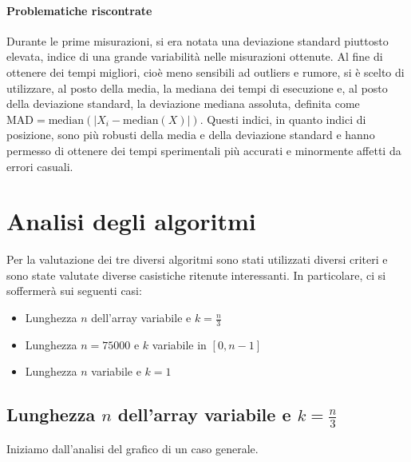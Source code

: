 \documentclass{article}
\begin{document}
	
	\paragraph{Problematiche riscontrate}
	Durante le prime misurazioni, si era notata una deviazione standard piuttosto elevata, indice di una grande variabilità nelle misurazioni ottenute. Al fine di ottenere dei tempi migliori, cioè meno sensibili ad outliers e rumore, si è scelto di utilizzare, al posto della media, la mediana dei tempi di esecuzione e, al posto della deviazione standard, la deviazione mediana assoluta, definita come $\textrm{MAD}=\textrm{median}\left(\mathopen|X_{i}-\textrm{median}\left(X\right)\mathclose|\right)$. Questi indici, in quanto indici di posizione, sono più robusti della media e della deviazione standard e hanno permesso di ottenere dei tempi sperimentali più accurati e minormente affetti da errori casuali.
	
	\newpage	
	\section{Analisi degli algoritmi}
	Per la valutazione dei tre diversi algoritmi sono stati utilizzati diversi criteri e sono state valutate diverse casistiche ritenute interessanti. In particolare, ci si soffermerà sui seguenti casi:
	
	\begin{itemize}
		\item Lunghezza $n$ dell'array variabile e $k=\frac{n}{3}$
		\item Lunghezza $n=75000$ e $k$ variabile in $[0,n-1]$
		\item Lunghezza $n$ variabile e $k=1$
	\end{itemize}
	
	\newpage
	
	\subsection{Lunghezza $n$ dell'array variabile e $k=\frac{n}{3}$}
	Iniziamo dall'analisi del grafico di un caso generale.
	
\end{document}
